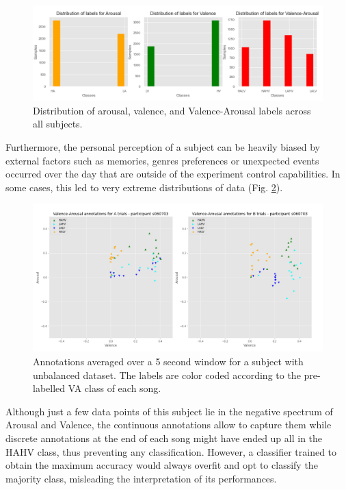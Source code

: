 \begin{figure}[h!]
\includegraphics[width=12cm]{img/methods/labels_distribution.png}
\centering
\caption{Distribution of arousal, valence, and Valence-Arousal labels across all subjects.} \label{fig_labels_distribution}
\end{figure}

Furthermore, the personal perception of a subject can be heavily biased by external factors such as memories, genres preferences or unexpected events occurred over the day that are outside of the experiment control capabilities. In some cases, this led to very extreme distributions of data (Fig. \ref{fig_unbalanced_example}).

\begin{figure}[h!]
\includegraphics[width=12cm]{img/methods/unbalanced_example.png}
\centering
\caption{Annotations averaged over a 5 second window for a subject with unbalanced dataset. The labels are color coded according to the pre-labelled VA class of each song.} \label{fig_unbalanced_example}
\end{figure}

Although just a few data points of this subject lie in the negative spectrum of Arousal and Valence, the continuous annotations allow to capture them while discrete annotations at the end of each song might have ended up all in the HAHV class, thus preventing any classification. However, a classifier trained to obtain the maximum accuracy would always overfit and opt to classify the majority class, misleading the interpretation of its performances. 

